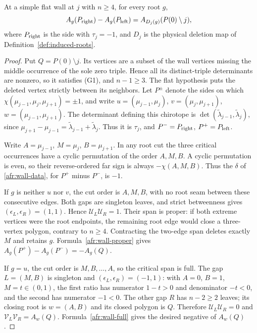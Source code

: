 \begin{theorem}\label{thm:A-S3}
At a simple flat wall at $j$ with $n\geq4$, for every root $g$,
\begin{equation}\label{afr:S3}
A_g(P_{\rm right})-A_g(P_{\rm left})
=A_{D_j(g)}(P(0)\setminus j),
\end{equation}
where $P_{\rm right}$ is the side with $\tau_j=-1$, and
$D_j$ is the physical deletion map of Definition~\ref{def:induced-roots}.
\end{theorem}
\begin{proof}
Put $Q=P(0)\setminus j$. Its vertices are a subset of the wall
vertices missing the middle occurrence of the sole zero triple. Hence
all its distinct-triple determinants are nonzero, so it satisfies (G1),
and $n-1\geq3$. The flat hypothesis puts the deleted vertex strictly
between its neighbors. Let $P^\pm$ denote the sides on which
$\chi(\mu_{j-1},\mu_j,\mu_{j+1})=\pm1$, and write
$u=(\mu_{j-1},\mu_j)$, $v=(\mu_j,\mu_{j+1})$,
$w=(\mu_{j-1},\mu_{j+1})$. The determinant defining this chirotope
is $\det(\widetilde\lambda_{j-1},\widetilde\lambda_j)$, since
$\mu_{j+1}-\mu_{j-1}=\widetilde\lambda_{j-1}+\widetilde\lambda_j$.
Thus it is $\tau_j$, and $P^-=P_{\rm right}$,
$P^+=P_{\rm left}$.

Write $A=\mu_{j-1}$, $M=\mu_j$, $B=\mu_{j+1}$.  In any root cut the
three critical occurrences have a cyclic permutation of the order
$A,M,B$.  A cyclic permutation is even, so their reverse-ordered far
sign is always $-\chi(A,M,B)$.  Thus the $\delta$ of
\eqref{afr:wall-data}, for $P^+$ minus $P^-$, is $-1$.

If $g$ is neither $u$ nor $v$, the cut order is $A,M,B$, with no
root seam between these consecutive edges.  Both gaps are singleton
leaves, and strict betweenness gives
$(\epsilon_L,\epsilon_R)=(1,1)$.  Hence $\mathcal U_L\mathcal U_R=1$.
Their span is proper: if both extreme vertices were the root endpoints,
the remaining root edge would close a three-vertex polygon, contrary
to $n\geq4$.  Contracting the two-edge span deletes exactly $M$
and retains $g$.  Formula~\eqref{afr:wall-proper} gives
$A_g(P^+)-A_g(P^-)=-A_g(Q)$.

If $g=u$, the cut order is $M,B,\ldots,A$, so the critical span is
full.  The gap $L=(M,B)$ is singleton and
$(\epsilon_L,\epsilon_R)=(-1,1)$: with $A=0$, $B=1$,
$M=t\in(0,1)$, the first ratio has numerator $1-t>0$ and
denominator $-t<0$, and the second has numerator $-1<0$.
The other gap $R$ has $n-2\geq2$ leaves; its closing root is
$w=(A,B)$ and its closed polygon is $Q$.  Therefore
$\mathcal U_L\mathcal U_R=0$ and $\mathcal V_L\mathcal V_R=A_w(Q)$.
Formula~\eqref{afr:wall-full} gives the desired negative of $A_w(Q)$.


\end{proof}
